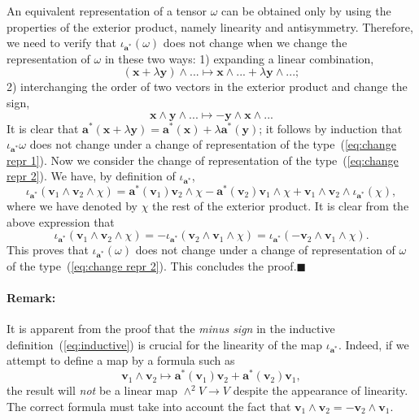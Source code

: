 An equivalent representation of a tensor $\omega$ can be obtained
only by using the properties of the exterior product, namely linearity
and antisymmetry. Therefore, we need to verify that $\iota_{\mathbf{a}^{*}}(\omega)$
does not change when we change the representation of $\omega$ in
these two ways: 1) expanding a linear combination,\begin{equation}
(\mathbf{x}+\lambda\mathbf{y})\wedge...\mapsto\mathbf{x}\wedge...+\lambda\mathbf{y}\wedge...;\label{eq:change repr 1}\end{equation}
2) interchanging the order of two vectors in the exterior product
and change the sign,\begin{equation}
\mathbf{x}\wedge\mathbf{y}\wedge...\mapsto-\mathbf{y}\wedge\mathbf{x}\wedge...\label{eq:change repr 2}\end{equation}
It is clear that $\mathbf{a}^{*}(\mathbf{x}+\lambda\mathbf{y})=\mathbf{a}^{*}(\mathbf{x})+\lambda\mathbf{a}^{*}(\mathbf{y})$;
it follows by induction that $\iota_{\mathbf{a}^{*}}\omega$ does
not change under a change of representation of the type~(\ref{eq:change repr 1}).
Now we consider the change of representation of the type~(\ref{eq:change repr 2}).
We have, by definition of $\iota_{\mathbf{a}^{*}}$,\[
\iota_{\mathbf{a}^{*}}(\mathbf{v}_{1}\wedge\mathbf{v}_{2}\wedge\chi)=\mathbf{a}^{*}(\mathbf{v}_{1})\mathbf{v}_{2}\wedge\chi-\mathbf{a}^{*}(\mathbf{v}_{2})\mathbf{v}_{1}\wedge\chi+\mathbf{v}_{1}\wedge\mathbf{v}_{2}\wedge\iota_{\mathbf{a}^{*}}(\chi),\]
where we have denoted by $\chi$ the rest of the exterior product.
It is clear from the above expression that \[
\iota_{\mathbf{a}^{*}}(\mathbf{v}_{1}\wedge\mathbf{v}_{2}\wedge\chi)=-\iota_{\mathbf{a}^{*}}(\mathbf{v}_{2}\wedge\mathbf{v}_{1}\wedge\chi)=\iota_{\mathbf{a}^{*}}(-\mathbf{v}_{2}\wedge\mathbf{v}_{1}\wedge\chi).\]
This proves that $\iota_{\mathbf{a}^{*}}(\omega)$ does not change
under a change of representation of $\omega$ of the type~(\ref{eq:change repr 2}).
This concludes the proof.\hfill{}$\blacksquare$


\paragraph{Remark:}

It is apparent from the proof that the \emph{minus sign} in the inductive
definition~(\ref{eq:inductive}) is crucial for the linearity of
the map $\iota_{\mathbf{a}^{*}}$. Indeed, if we attempt to define
a map by a formula such as\[
\mathbf{v}_{1}\wedge\mathbf{v}_{2}\mapsto\mathbf{a}^{*}(\mathbf{v}_{1})\mathbf{v}_{2}+\mathbf{a}^{*}(\mathbf{v}_{2})\mathbf{v}_{1},\]
the result will \emph{not} be a linear map $\wedge^{2}V\rightarrow V$
despite the appearance of linearity. The correct formula must take
into account the fact that $\mathbf{v}_{1}\wedge\mathbf{v}_{2}=-\mathbf{v}_{2}\wedge\mathbf{v}_{1}$.


